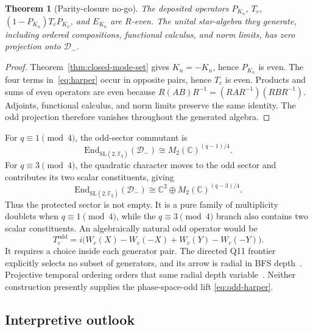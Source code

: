 \documentclass[11pt,a4paper]{article}
\newtheorem{theorem}{Theorem}[section]
\theoremstyle{definition}
\theoremstyle{remark}
\newcommand{\C}{\mathbb{C}}
\newcommand{\Fq}{\mathbb{F}_q}
\newcommand{\G}{\mathrm{SL}(2,\Fq)}
\newcommand{\End}{\mathrm{End}}
\newcommand{\Dminus}{\mathcal{D}_{-}}
\begin{document}
\begin{theorem}[Parity-closure no-go]
  \label{thm:parity-closure}
  The deposited operators $P_{K_n}$, $T_c$, $(1-P_{K_n})T_cP_{K_n}$, and $E_{K_n}$ are
  $R$-even.
  The unital star-algebra they generate, including ordered compositions, functional calculus,
  and norm limits, has zero projection onto $\Dminus$.
\end{theorem}

\begin{proof}
  Theorem~\ref{thm:closed-mode-set} gives $K_n=-K_n$, hence $P_{K_n}$ is even.
  The four terms in~\eqref{eq:harper} occur in opposite pairs, hence $T_c$ is even.
  Products and sums of even operators are even because
  $R(AB)R^{-1}=(RAR^{-1})(RBR^{-1})$.
  Adjoints, functional calculus, and norm limits preserve the same identity.
  The odd projection therefore vanishes throughout the generated algebra.
\end{proof}

For $q\equiv1\pmod4$, the odd-sector commutant is
\begin{equation}
  \End_{\G}(\Dminus)\cong M_2(\C)^{(q-1)/4}.
  \label{eq:odd-commutant}
\end{equation}
For $q\equiv3\pmod4$, the quadratic character moves to the odd sector and contributes its
two scalar constituents, giving
\begin{equation}
  \End_{\G}(\Dminus)\cong\C^2\oplus M_2(\C)^{(q-3)/4}.
  \label{eq:odd-commutant-three}
\end{equation}
Thus the protected sector is not empty.
It is a pure family of multiplicity doublets when $q\equiv1\pmod4$, while the
$q\equiv3\pmod4$ branch also contains two scalar constituents.
An algebraically natural odd operator would be
\begin{equation}
  T_c^{\mathrm{odd}}
  =i\bigl(W_c(X)-W_c(-X)+W_c(Y)-W_c(-Y)\bigr).
  \label{eq:odd-harper}
\end{equation}
It requires a choice inside each generator pair.
The directed Q11 frontier explicitly selects no subset of generators, and its arrow is
radial in BFS depth~\cite{Beau2026q11of}.
Projective temporal ordering orders that same radial depth variable~\cite{Beau2026pto}.
Neither construction presently supplies the phase-space-odd lift
\eqref{eq:odd-harper}.

\subsection*{Interpretive outlook}
\end{document}

